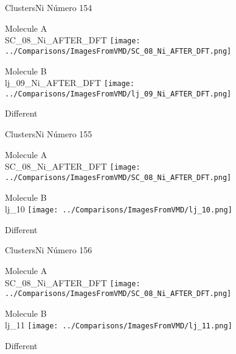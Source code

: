  \newpage

\vtab[-3cm]
\begin{center}
{\large ClustersNi \tab Número 154}
\end{center}
\begin{multicols}{2}
\begin{center}
Molecule A \\ 
SC\_08\_Ni\_AFTER\_DFT
\texttt{[image: ../Comparisons/ImagesFromVMD/SC\_08\_Ni\_AFTER\_DFT.png]}
\\
\vtab

\columnbreak
Molecule B \\ 
lj\_09\_Ni\_AFTER\_DFT
\texttt{[image: ../Comparisons/ImagesFromVMD/lj\_09\_Ni\_AFTER\_DFT.png]}
\\
\vtab


\end{center}
\end{multicols}
\begin{center}
\textcolor{NavyBlue}{\Large Different}
\end{center}

 \newpage

\vtab[-3cm]
\begin{center}
{\large ClustersNi \tab Número 155}
\end{center}
\begin{multicols}{2}
\begin{center}
Molecule A \\ 
SC\_08\_Ni\_AFTER\_DFT
\texttt{[image: ../Comparisons/ImagesFromVMD/SC\_08\_Ni\_AFTER\_DFT.png]}
\\
\vtab

\columnbreak
Molecule B \\ 
lj\_10
\texttt{[image: ../Comparisons/ImagesFromVMD/lj\_10.png]}
\\
\vtab


\end{center}
\end{multicols}
\begin{center}
\textcolor{NavyBlue}{\Large Different}
\end{center}

 \newpage

\vtab[-3cm]
\begin{center}
{\large ClustersNi \tab Número 156}
\end{center}
\begin{multicols}{2}
\begin{center}
Molecule A \\ 
SC\_08\_Ni\_AFTER\_DFT
\texttt{[image: ../Comparisons/ImagesFromVMD/SC\_08\_Ni\_AFTER\_DFT.png]}
\\
\vtab

\columnbreak
Molecule B \\ 
lj\_11
\texttt{[image: ../Comparisons/ImagesFromVMD/lj\_11.png]}
\\
\vtab


\end{center}
\end{multicols}
\begin{center}
\textcolor{NavyBlue}{\Large Different}
\end{center}

